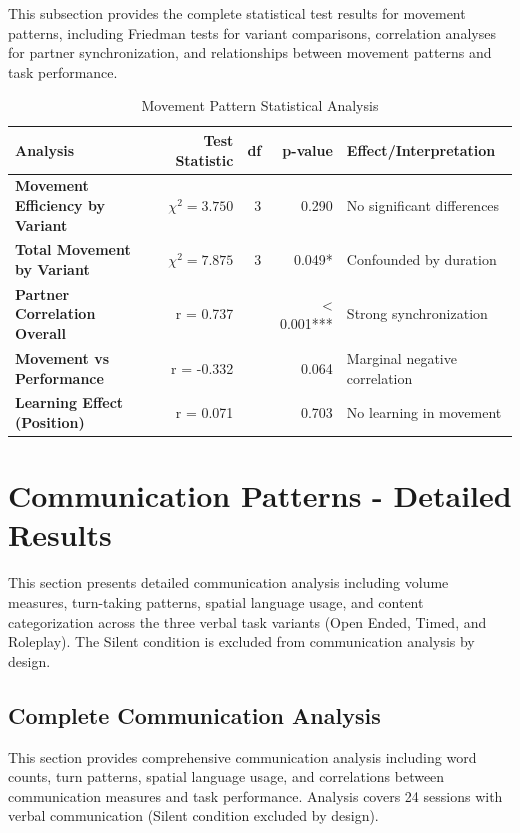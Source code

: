 This subsection provides the complete statistical test results for movement patterns, including Friedman tests for variant comparisons, correlation analyses for partner synchronization, and relationships between movement patterns and task performance.

\begin{table}[H]
\centering
\caption{Movement Pattern Statistical Analysis}
\label{tab:movement_tests_complete}
\begin{tabular}{lrrrl}
\toprule
\textbf{Analysis} & \textbf{Test Statistic} & \textbf{df} & \textbf{p-value} & \textbf{Effect/Interpretation} \\
\midrule
\textbf{Movement Efficiency by Variant} & $\chi^2 = 3.750$ & 3 & 0.290 & No significant differences \\
\textbf{Total Movement by Variant} & $\chi^2 = 7.875$ & 3 & 0.049* & Confounded by duration \\
\textbf{Partner Correlation Overall} & r = 0.737 & & < 0.001*** & Strong synchronization \\
\textbf{Movement vs Performance} & r = -0.332 & & 0.064 & Marginal negative correlation \\
\textbf{Learning Effect (Position)} & r = 0.071 & & 0.703 & No learning in movement \\
\bottomrule
\end{tabular}
\end{table}

\section{Communication Patterns - Detailed Results}
\label{appendix:communication_results}

This section presents detailed communication analysis including volume measures, turn-taking patterns, spatial language usage, and content categorization across the three verbal task variants (Open Ended, Timed, and Roleplay). The Silent condition is excluded from communication analysis by design.

\subsection{Complete Communication Analysis}

This section provides comprehensive communication analysis including word counts, turn patterns, spatial language usage, and correlations between communication measures and task performance. Analysis covers 24 sessions with verbal communication (Silent condition excluded by design).

